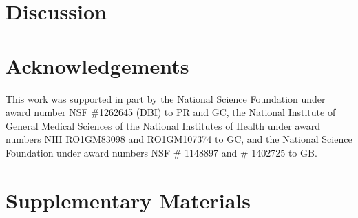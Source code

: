 \documentclass[12pt]{article}
\begin{document}
\section*{Discussion}

\section*{Acknowledgements}

This work was supported in part by 
the National Science Foundation under award number NSF \#1262645 (DBI) to PR and GC, 
the National Institute of General Medical Sciences of the National Institutes of Health under award numbers NIH RO1GM83098 and RO1GM107374 to GC,
and the National Science Foundation under award numbers NSF \# 1148897 and \# 1402725 to GB.


\newpage



\newpage

\section*{Supplementary Materials}
\renewcommand{\thefigure}{S\arabic{figure}}
\setcounter{figure}{0}
\renewcommand{\thetable}{S\arabic{table}}
\setcounter{table}{0}
\renewcommand{\theequation}{S\arabic{table}}
\setcounter{equation}{0}
\end{document}
